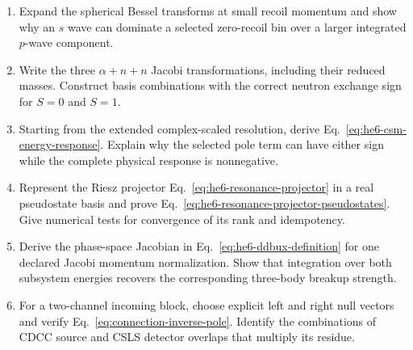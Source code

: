 \begin{enumerate}[label=\textbf{VI.\arabic*},leftmargin=*]
  \item Expand the spherical Bessel transforms at small recoil momentum and
  show why an $s$ wave can dominate a selected zero-recoil bin over a larger
  integrated $p$-wave component.

  \item Write the three $\alpha+n+n$ Jacobi transformations, including their
  reduced masses.  Construct basis combinations with the correct neutron
  exchange sign for $S=0$ and $S=1$.

  \item Starting from the extended complex-scaled resolution, derive
  Eq.~\eqref{eq:he6-csm-energy-response}.  Explain why the selected pole term
  can have either sign while the complete physical response is nonnegative.

  \item Represent the Riesz projector
  Eq.~\eqref{eq:he6-resonance-projector} in a real pseudostate basis and
  prove Eq.~\eqref{eq:he6-resonance-projector-pseudostates}.  Give numerical
  tests for convergence of its rank and idempotency.

  \item Derive the phase-space Jacobian in
  Eq.~\eqref{eq:he6-ddbux-definition} for one declared Jacobi momentum
  normalization.  Show that integration over both subsystem energies recovers
  the corresponding three-body breakup strength.

  \item For a two-channel incoming block, choose explicit left and right null
  vectors and verify Eq.~\eqref{eq:connection-inverse-pole}.  Identify the
  combinations of CDCC source and CSLS detector overlaps that multiply its
  residue.
\end{enumerate}

